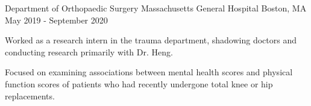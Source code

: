 \begin{cventries}
  \cventry
    {Department of Orthopaedic Surgery} %
    {Massachusetts General Hospital} %
    {Boston, MA} %
    {May 2019 - September 2020} %
    {
      \begin{cvitems} %
        \item {Worked as a research intern in the trauma department, shadowing 
        doctors and conducting research primarily with Dr. Heng.} 
        \item {Focused on examining associations between mental health scores
        and physical function scores of patients who had recently undergone 
        total knee or hip replacements.}
      \end{cvitems}
    }

\end{cventries}
